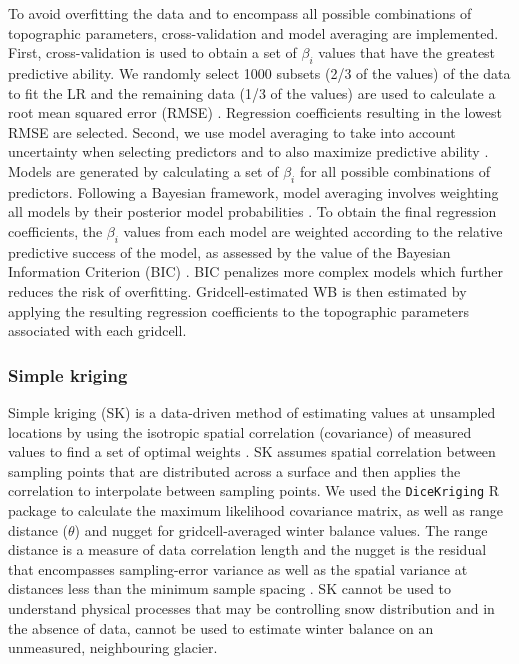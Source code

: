 \documentclass[twocolumn, letterpaper]{igs}
\begin{document}
To avoid overfitting the data and to encompass all possible combinations of topographic parameters, cross-validation and model averaging are implemented. First, cross-validation is used to obtain a set of $\beta_i$ values that have the greatest predictive ability. We randomly select 1000 subsets (2/3 of the values) of the data to fit the LR and the remaining data (1/3 of the values) are used to calculate a root mean squared error (RMSE) \citep{Kohavi1995}. Regression coefficients resulting in the lowest RMSE are selected. Second, we use model averaging to take into account uncertainty when selecting predictors and to also maximize predictive ability \citep{Madigan1994}. Models are generated by calculating a set of $\beta_i$ for all possible combinations of predictors. Following a Bayesian framework, model averaging involves weighting all models by their posterior model probabilities \citep{Raftery1997}. To obtain the final regression coefficients, the $\beta_i$ values from each model are weighted according to the relative predictive success of the model, as assessed by the value of the Bayesian Information Criterion (BIC) \citep{Burnham2004}. BIC penalizes more complex models which further reduces the risk of overfitting. Gridcell-estimated WB is then estimated by applying the resulting regression coefficients to the topographic parameters associated with each gridcell. 

\subsubsection{Simple kriging}

Simple kriging (SK) is a data-driven method of estimating values at unsampled locations by using the isotropic spatial correlation (covariance) of measured values to find a set of optimal weights \citep{Davis1986, Li2008}. SK assumes spatial correlation between sampling points that are distributed across a surface and then applies the correlation to interpolate between sampling points. We used the \texttt{DiceKriging} R package \citep{Roustant2012} to calculate the maximum likelihood covariance matrix, as well as range distance ($\theta$) and nugget for gridcell-averaged winter balance values. The range distance is a measure of data correlation length and the nugget is the residual that encompasses sampling-error variance as well as the spatial variance at distances less than the minimum sample spacing \citep{Li2008}. SK cannot be used to understand physical processes that may be controlling snow distribution and in the absence of data, cannot be used to estimate winter balance on an unmeasured, neighbouring glacier. 
\end{document}
